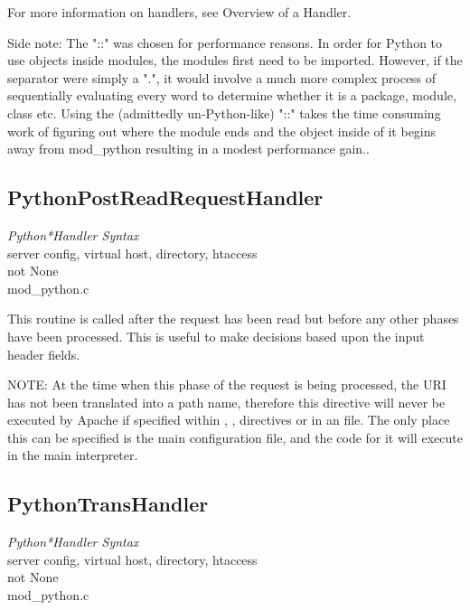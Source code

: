 For more information on handlers, see Overview of a Handler.

Side note: The "::" was chosen for performance reasons. In order for
Python to use objects inside modules, the modules first need to be
imported. However, if the separator were simply a ".", it would
involve a much more complex process of sequentially evaluating every
word to determine whether it is a package, module, class etc. Using
the (admittedly un-Python-like) "::" takes the time consuming work of
figuring out where the module ends and the object inside of it begins
away from mod_python resulting in a modest performance gain..

\subsection{PythonPostReadRequestHandler\label{dir-handlers-prrh}}

\emph{Python*Handler Syntax}\\
server config, virtual host, directory, htaccess\\
not None\\
mod_python.c

This routine is called after the request has been read but before any
other phases have been processed. This is useful to make decisions
based upon the input header fields.

NOTE: At the time when this phase of the request is being processed,
the URI has not been translated into a path name, therefore this
directive will never be executed by Apache if specified within
, ,  directives or in
an  file. The only place this can be specified is the
main configuration file, and the code for it will execute in the
main interpreter.


\subsection{PythonTransHandler\label{dir-handlers-th}}

\emph{Python*Handler Syntax}\\
server config, virtual host, directory, htaccess\\
not None\\
mod_python.c

